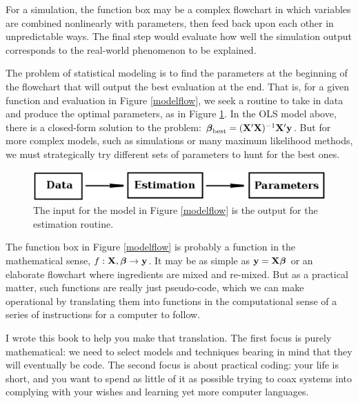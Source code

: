 For a simulation, the function box may be a complex flowchart in which
variables are combined nonlinearly with parameters, then feed back upon
each other in unpredictable ways. The final step
would evaluate how well the simulation output corresponds to the
real-world phenomenon to be explained.

The problem of statistical modeling is to find the parameters at the
beginning of the flowchart that will output the best evaluation at the
end. That is, for a given function and evaluation in Figure
\ref{modelflow}, we seek a routine to take in data and produce the optimal parameters, as in Figure \ref{modelflowback}.
In the OLS model above, there is a closed-form solution to the problem:
${\mbox{\boldmath$\beta$}}_{\rm best}=({\bf X}'{\bf X})^{-1}{\bf X}'{\bf y}$.  But for more complex models,
such as simulations or many maximum likelihood methods, we must strategically
try different sets of parameters to hunt for the best ones.

\begin{figure}[htb]
\begin{center}
\includegraphics[width=\textwidth*\real{0.85}]{models2}
\end{center}

\caption{The input for the model in Figure \ref{modelflow} is the output for the estimation routine.}
\label{modelflowback}
\end{figure}


 The function box in Figure \ref{modelflow} is probably a
function in the mathematical sense, $f:{\bf X}, {\mbox{\boldmath$\beta$}} \to {\bf y}$. It may
be as simple as ${\bf y} = {\bf X}{\mbox{\boldmath$\beta$}}$ or an elaborate flowchart where
ingredients are mixed and re-mixed.  But as a practical matter, such
functions are really just pseudo-code, which we can make operational by
translating them into functions in the computational sense of a series
of instructions for a computer to follow.

I wrote this book to help you make that translation. The first focus
is purely mathematical: we need to select models and techniques bearing
in mind that they will eventually be code. The second focus is about
practical coding: your life is short, and you want to spend as little
of it as possible trying to coax systems into complying with your wishes
and learning yet more computer languages.

